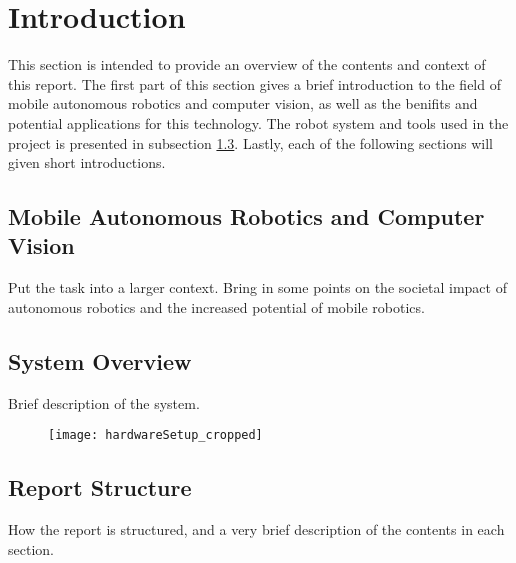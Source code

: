 \section{Introduction}

This section is intended to provide an overview of the contents and context of this report. The first part of this section gives a brief introduction to the field of mobile autonomous robotics and computer vision, as well as the benifits and potential applications for this technology. The robot system and tools used in the project is presented in subsection \ref{}. Lastly, each of the following sections will given short introductions.

  
\subsection{Mobile Autonomous Robotics and Computer Vision}

Put the task into a larger context. Bring in some points on the societal impact of autonomous robotics and the increased potential of mobile robotics.  

\subsection{System Overview}

Brief description of the system.

\begin{figure}
	\texttt{[image: hardwareSetup\_cropped]}
\end{figure}

\subsection{Report Structure}
How the report is structured, and a very brief description of the contents in each section.